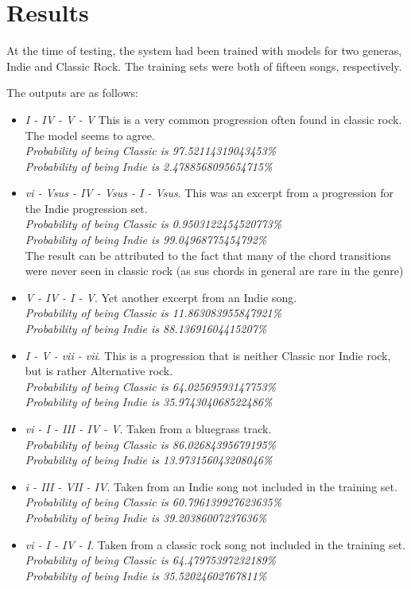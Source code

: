\documentclass{article}
\begin{document}
\newpage

\section{Results}

At the time of testing, the system had been trained with models for two generas, Indie and Classic Rock.
The training sets were both of fifteen songs, respectively.

 The outputs are as follows:

\begin{itemize}
\item \emph{I - IV - V - V} This is a very common progression often
	found in classic rock. The model seems to agree. \\
	\emph{Probability of being Classic is 97.52114319043453\%} \\
	\emph{Probability of being Indie is 2.4788568095654715\%} \\
\item \emph{vi - Vsus - IV - Vsus - I - Vsus}. This was an excerpt
	from a progression for the Indie progression set. \\
	\emph{Probability of being Classic is 0.9503122454520773\%} \\
	\emph{Probability of being Indie is 99.04968775454792\%} \\
	The result can be attributed to the fact that many of the
	chord transitions were never seen in classic rock (as
	sus chords in general are rare in the genre) \\
\item \emph{V - IV - I - V}. Yet another excerpt from an Indie
	song. \\
	\emph{Probability of being Classic is 11.863083955847921\%} \\
	\emph{Probability of being Indie is 88.13691604415207\%} \\
\item \emph{I - V - vii - vii}. This is a progression that is
	neither Classic nor Indie rock, but is rather Alternative
	rock. \\
	\emph{Probability of being Classic is 64.02569593147753\%} \\
	\emph{Probability of being Indie is 35.974304068522486\%}
\item \emph{vi - I - III - IV - V}. Taken from a bluegrass track. \\
	\emph{Probability of being Classic is 86.02684395679195\%} \\
	\emph{Probability of being Indie is 13.973156043208046\%}
\item \emph{i - III - VII - IV}. Taken from an Indie song not
	included in the training set. \\
	\emph{Probability of being Classic is 60.796139927623635\%} \\
	\emph{Probability of being Indie is 39.20386007237636\%}
\item \emph{vi - I - IV - I}. Taken from a classic rock song
	not included in the training set. \\
	\emph{Probability of being Classic is 64.47975397232189\%} \\
	\emph{Probability of being Indie is 35.52024602767811\%}
\end{itemize}
\end{document}

